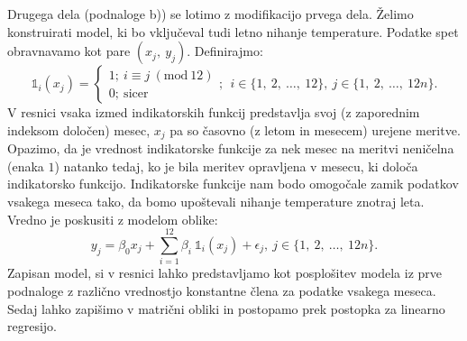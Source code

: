 \documentclass{article}
\begin{document}
Drugega dela (podnaloge b)) se lotimo z modifikacijo prvega dela. Želimo konstruirati model, ki bo vključeval tudi letno nihanje temperature. 
Podatke spet obravnavamo kot pare $(x_j,~y_j)$. Definirajmo:
$$
\mathds{1}_i(x_j)= \begin{cases}
    1;~ i \equiv j~(\text{mod}~12) \\
    0;~\text{sicer}
\end{cases};~~i \in \{1,~2,~\dots,~12\},~j \in \{1,~2,~\dots,~12n\}.
$$
V resnici vsaka izmed indikatorskih funkcij predstavlja svoj (z zaporednim indeksom določen) mesec, $x_j$ pa so časovno (z letom in mesecem) urejene meritve. 
Opazimo, da je vrednost indikatorske funkcije za nek mesec na meritvi neničelna (enaka $1$) natanko tedaj, ko je bila meritev opravljena v mesecu, ki določa indikatorsko funkcijo.
Indikatorske funkcije nam bodo omogočale zamik podatkov vsakega meseca tako, da bomo upoštevali nihanje temperature znotraj leta. 
Vredno je poskusiti z modelom oblike:
$$
    y_j = \beta_0 x_j + \sum_{i=1}^{12}{\beta_{i}~\mathds{1}_i(x_j)} + \epsilon_j,~j \in \{1,~2,~\dots,~12n\}.
$$
Zapisan model, si v resnici lahko predstavljamo kot posplošitev modela iz prve podnaloge z različno vrednostjo konstantne člena za podatke vsakega meseca. 
\newline
\newline
Sedaj lahko zapišimo v  matrični obliki in postopamo prek postopka za linearno regresijo. 
\end{document}
